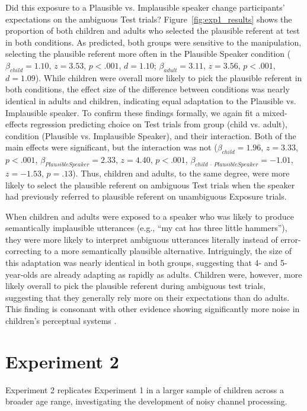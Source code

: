 \documentclass[man,floatsintext]{apa6}
\begin{document}
Did this exposure to a Plausible vs. Implausible speaker change participants' expectations on the ambiguous Test trials? Figure~\ref{fig:exp1_results} shows the proportion of both children and adults who selected the plausible referent at test in both conditions. As predicted, both groups were sensitive to the manipulation, selecting the plausible referent more often in the Plausible Speaker condition ($\beta_{child} = 1.10$, $z = 3.53$, $p <.001$, $d = 1.10$; $\beta_{adult} = 3.11$, $z = 3.56$, $p <.001$, $d = 1.09$). While children were overall more likely to pick the plausible referent in both conditions, the effect size of the difference between conditions was nearly identical in adults and children, indicating equal adaptation to the Plausible vs. Implausible speaker. To confirm these findings formally, we again fit a mixed-effects regression predicting choice on Test trials from group (child vs. adult), condition (Plausible vs. Implausible Speaker), and their interaction. Both of the main effects were significant, but the interaction was not ($\beta_{child} = 1.96$,  $z = 3.33$, $p <.001$, $\beta_{Plausible Speaker} = 2.33$,  $z = 4.40$, $p <.001$,  $\beta_{child \: \cdot \: Plausible Speaker} = -1.01$,  $z = -1.53$, $p = .13$). Thus, children and adults, to the same degree, were more likely to select the plausible referent on ambiguous Test trials when the speaker had previously referred to plausible referent on unambiguous Exposure trials.

When children and adults were exposed to a speaker who was likely to produce semantically implausible utterances (e.g., ``my cat has three little hammers''), they were more likely to interpret ambiguous utterances literally instead of error-correcting to a more semantically plausible alternative. Intriguingly, the size of this adaptation was nearly identical in both groups, suggesting that 4- and 5-year-olds are already adapting as rapidly as adults. Children were, however, more likely overall to pick the plausible referent during ambiguous test trials, suggesting that they generally rely more on their expectations than do adults. This finding is consonant with other evidence showing significantly more noise in children's perceptual systems \cite{neuman1983}.

\section{Experiment 2}

Experiment 2 replicates Experiment 1 in a larger sample of children across a broader age range, investigating the development of noisy channel processing.
\end{document}
